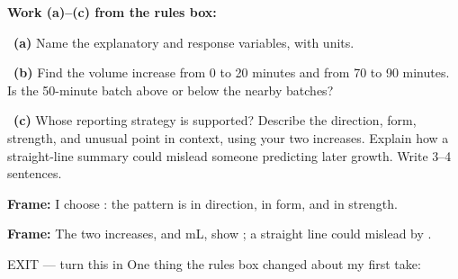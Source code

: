 \documentclass[11pt]{article}
\begin{document}
\newpage
\textbf{Work (a)--(c) from the rules box:}\par\smallskip

~\textbf{(a)} Name the explanatory and response variables, with units.\par
\workspace{0.55in}

~\textbf{(b)} Find the volume increase from 0 to 20 minutes and from 70 to 90 minutes. Is the 50-minute batch above or below the nearby batches?\par
\workspace{1.1in}

~\textbf{(c)} Whose reporting strategy is supported? Describe the direction, form, strength, and unusual point in context, using your two increases. Explain how a straight-line summary could mislead someone predicting later growth. Write 3--4 sentences.\par
\workspace{1.7in}

\begin{sentenceframebox}\raggedright\textbf{Frame:} I choose \blank[0.7in]: the pattern is \blank[1.0in] in direction, \blank[1.0in] in form, and \blank[1.0in] in strength.\end{sentenceframebox}

\begin{sentenceframebox}\raggedright\textbf{Frame:} The two increases, \blank[0.6in] and \blank[0.6in] mL, show \blank[1.6in]; a straight line could mislead by \blank[1.8in].\end{sentenceframebox}

\begin{summaryexitbox}{EXIT --- turn this in}
One thing the rules box changed about my first take: \hrulefill\par
\workspace{0.4in}
\end{summaryexitbox}
\end{document}
